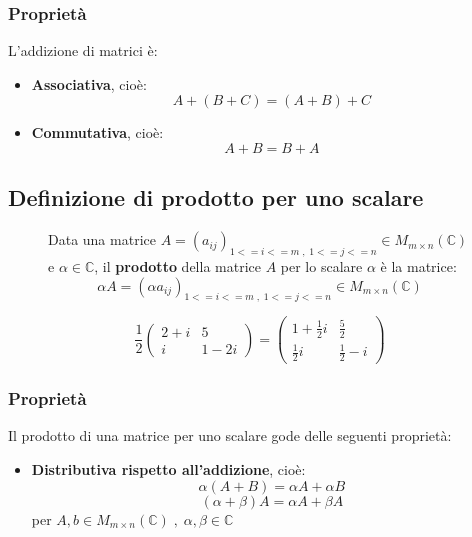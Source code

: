 \documentclass[a4paper]{article}
\theoremstyle{break}
\theoremstyle{break}
\theoremstyle{break}
\theoremstyle{break}
\begin{document}
\subsubsection{Proprietà}
L'addizione di matrici è:
\begin{itemize}
  \item \textbf{Associativa}, cioè:
    \[
      A + (B + C) = (A + B) + C
    \] 
  \item \textbf{Commutativa}, cioè:
    \[
      A + B = B + A
    \]
\end{itemize}

\subsection{Definizione di prodotto per uno scalare}
\begin{figure}[H]
  \begin{definition}
    Data una matrice \( A = (a_{ij})_{1<=i<=m\;,\;1<=j<=n} \in M_{m \times n}(\mathbb{C}) \) e
    \( \alpha \in \mathbb{C} \), il \textbf{prodotto} della matrice \( A \) per lo scalare
    \( \alpha \) è la matrice:
    \[
      \alpha A = (\alpha a_{ij})_{1<=i<=m\;,\;1<=j<=n} \in M_{m \times n}(\mathbb{C})
    \] 
  \end{definition}
\end{figure}
\begin{figure}[H]
  \begin{example}
    \[
    \frac{1}{2}\begin{pmatrix} 
      2+i & 5\\
      i & 1-2i
    \end{pmatrix} 
    =
    \begin{pmatrix} 
      1+\frac{1}{2}i & \frac{5}{2} \\
      \frac{1}{2}i & \frac{1}{2}-i
    \end{pmatrix}
    \] 
  \end{example}
\end{figure}

\subsubsection{Proprietà}
Il prodotto di una matrice per uno scalare gode delle seguenti proprietà:
\begin{itemize}
  \item \textbf{Distributiva rispetto all'addizione}, cioè:
    \[
      \alpha(A+B) = \alpha A + \alpha B
    \] 
    \[
      (\alpha + \beta)A = \alpha A + \beta A
    \] 
    per \( A,b \in M_{m \times n}(\mathbb{C})\;,\; \alpha,\beta \in \mathbb{C} \) 
\end{itemize}
\end{document}
